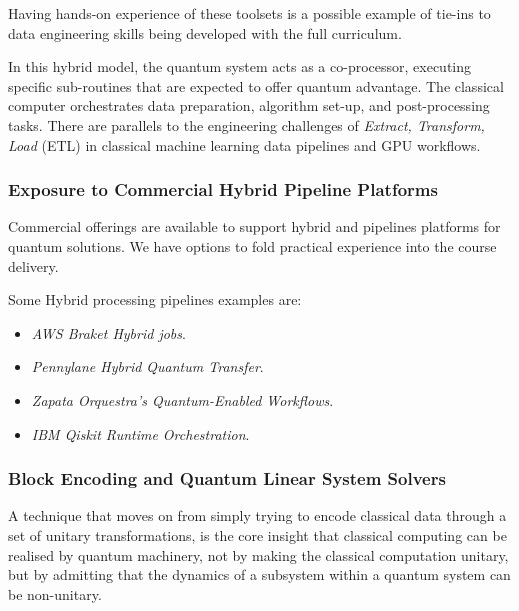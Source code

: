 Having hands-on experience of these toolsets is a possible example of tie-ins to 
data engineering skills being developed with the full curriculum.

In this hybrid model, 
the quantum system acts as a co-processor, executing specific sub-routines that are expected to offer quantum advantage.
The classical computer orchestrates data preparation, algorithm set-up, and post-processing tasks.
There are parallels to the engineering challenges of \emph{Extract, Transform, Load} (ETL) 
in classical machine learning data pipelines and GPU workflows.

\subsubsection{Exposure to Commercial Hybrid Pipeline Platforms}

Commercial offerings are available to support hybrid and pipelines platforms for quantum solutions.
We have options to fold practical experience into the course delivery.

Some Hybrid processing pipelines examples are:
\begin{itemize}
	\item \emph{AWS Braket Hybrid jobs}\cite{AWS:Braket:Hybrid}.
	\item \emph{Pennylane Hybrid Quantum Transfer}\cite{Pennylane:Hybrid}.
	\item \emph{Zapata Orquestra's Quantum-Enabled Workflows}\cite{Zapata:Orquestra}.
	\item \emph{IBM Qiskit Runtime Orchestration}\cite{IBM:Qiskit:Orchestration}.
\end{itemize}

\subsubsection{Block Encoding and Quantum Linear System Solvers}

A technique that moves on from simply trying to encode classical data through a set of unitary transformations, is
the core insight that classical computing can be realised by quantum machinery, 
not by making the classical computation unitary,
but by admitting that the dynamics of a subsystem within a quantum system can be non-unitary.

